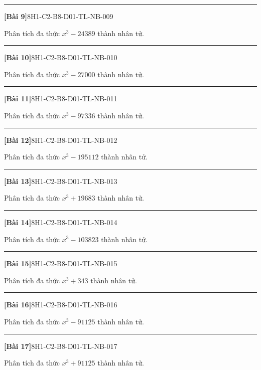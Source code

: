 \documentclass[12pt,a4paper]{article}
\newif\ifloigiai
\newenvironment{cauhoi}[2]{%
  \par\medskip\noindent\rule{\textwidth}{0.4pt}\par\nopagebreak
  \noindent\textbf{[#1]}\hfill{\scriptsize\ttfamily #2}\par\nopagebreak\smallskip}{\par}
\newcommand{\loigiai}[1]{\ifloigiai\par\smallskip\noindent\textit{Lời giải.} #1\par\fi}
\begin{document}
\begin{cauhoi}{Bài 9}{8H1-C2-B8-D01-TL-NB-009}
Phân tích đa thức $x^{3}-24389$ thành nhân tử.
\loigiai{Áp dụng hằng đẳng thức $a^{3}-b^{3}=(a-b)(a^{2}+ab+b^{2})$ với $b=29$: $x^{3}-24389=(x-29)(x^{2}+29x+841)$.}
\end{cauhoi}
\begin{cauhoi}{Bài 10}{8H1-C2-B8-D01-TL-NB-010}
Phân tích đa thức $x^{3}-27000$ thành nhân tử.
\loigiai{Áp dụng hằng đẳng thức $a^{3}-b^{3}=(a-b)(a^{2}+ab+b^{2})$ với $b=30$: $x^{3}-27000=(x-30)(x^{2}+30x+900)$.}
\end{cauhoi}
\begin{cauhoi}{Bài 11}{8H1-C2-B8-D01-TL-NB-011}
Phân tích đa thức $x^{3}-97336$ thành nhân tử.
\loigiai{Áp dụng hằng đẳng thức $a^{3}-b^{3}=(a-b)(a^{2}+ab+b^{2})$ với $b=46$: $x^{3}-97336=(x-46)(x^{2}+46x+2116)$.}
\end{cauhoi}
\begin{cauhoi}{Bài 12}{8H1-C2-B8-D01-TL-NB-012}
Phân tích đa thức $x^{3}-195112$ thành nhân tử.
\loigiai{Áp dụng hằng đẳng thức $a^{3}-b^{3}=(a-b)(a^{2}+ab+b^{2})$ với $b=58$: $x^{3}-195112=(x-58)(x^{2}+58x+3364)$.}
\end{cauhoi}
\begin{cauhoi}{Bài 13}{8H1-C2-B8-D01-TL-NB-013}
Phân tích đa thức $x^{3}+19683$ thành nhân tử.
\loigiai{Áp dụng hằng đẳng thức $a^{3}+b^{3}=(a+b)(a^{2}-ab+b^{2})$ với $b=27$: $x^{3}+19683=(x+27)(x^{2}-27x+729)$.}
\end{cauhoi}
\begin{cauhoi}{Bài 14}{8H1-C2-B8-D01-TL-NB-014}
Phân tích đa thức $x^{3}-103823$ thành nhân tử.
\loigiai{Áp dụng hằng đẳng thức $a^{3}-b^{3}=(a-b)(a^{2}+ab+b^{2})$ với $b=47$: $x^{3}-103823=(x-47)(x^{2}+47x+2209)$.}
\end{cauhoi}
\begin{cauhoi}{Bài 15}{8H1-C2-B8-D01-TL-NB-015}
Phân tích đa thức $x^{3}+343$ thành nhân tử.
\loigiai{Áp dụng hằng đẳng thức $a^{3}+b^{3}=(a+b)(a^{2}-ab+b^{2})$ với $b=7$: $x^{3}+343=(x+7)(x^{2}-7x+49)$.}
\end{cauhoi}
\begin{cauhoi}{Bài 16}{8H1-C2-B8-D01-TL-NB-016}
Phân tích đa thức $x^{3}-91125$ thành nhân tử.
\loigiai{Áp dụng hằng đẳng thức $a^{3}-b^{3}=(a-b)(a^{2}+ab+b^{2})$ với $b=45$: $x^{3}-91125=(x-45)(x^{2}+45x+2025)$.}
\end{cauhoi}
\begin{cauhoi}{Bài 17}{8H1-C2-B8-D01-TL-NB-017}
Phân tích đa thức $x^{3}+91125$ thành nhân tử.
\loigiai{Áp dụng hằng đẳng thức $a^{3}+b^{3}=(a+b)(a^{2}-ab+b^{2})$ với $b=45$: $x^{3}+91125=(x+45)(x^{2}-45x+2025)$.}
\end{cauhoi}
\end{document}
